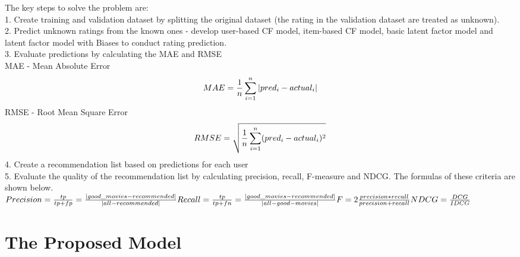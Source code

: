 \documentclass[sigconf]{acmart}
\begin{document}
The key steps to solve the problem are:\\
1. Create training and validation dataset by splitting the original dataset (the rating in the validation dataset are treated as unknown).\\
2. Predict unknown ratings from the known ones - develop user-based CF model, item-based CF model, basic latent factor model and latent factor model with Biases to conduct rating prediction.\\
3. Evaluate predictions by calculating the MAE and RMSE\\
MAE - Mean Absolute Error\\
\begin{equation*} 
MAE = \frac{1}{n}\sum_{i=1}^n|pred_i - actual_i|\\
\end{equation*} 
RMSE - Root Mean Square Error\\
\begin{equation*} 
RMSE = \sqrt{\frac{1}{n}\sum_{i=1}^n(pred_i - actual_i)^2}\\
\end{equation*} 
4. Create a recommendation list based on predictions for each user\\
5. Evaluate the quality of the recommendation list by calculating precision, recall, F-measure and NDCG. The formulas of these criteria are shown below.\\
$Precision = \frac{tp}{tp+fp}=\frac{|good\_movies - recommended|}{|all-recommended|}\\
Recall = \frac{tp}{tp+fn}=\frac{|good\_movies - recommended|}{|all-good-movies|}\\
F = 2\frac{precision*recall}{precision + recall}\\
NDCG = \frac{DCG}{IDCG}$\\


\section{The Proposed Model}\label{sec:framework}
\end{document}

